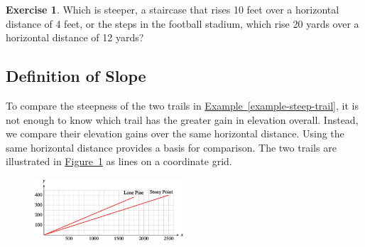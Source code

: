 \documentclass[10pt,]{book}
\theoremstyle{plain}
\theoremstyle{definition}
\newtheorem{exercise}[theorem]{Exercise}
\theoremstyle{definition}
\numberwithin{equation}{section}
\begin{document}
\begin{exercise}\label{exercise-steep-steps}
Which is steeper, a staircase that rises 10 feet over a horizontal distance of 4 feet, or the steps in the football stadium, which rise 20 yards over a horizontal distance of 12 yards?\end{exercise}
\typeout{************************************************}
\typeout{************************************************}
\subsection[Definition of Slope]{Definition of Slope}\label{subsection-19}

    To compare the steepness of the two trails in \hyperref[example-steep-trail]{Example~\ref{example-steep-trail}}, it is not enough to know which trail has the greater gain in elevation overall. Instead, we compare their elevation gains over the same horizontal distance. Using the same horizontal distance provides a basis for comparison. The two trails are illustrated in \hyperref[fig-trail-climb-grid]{Figure~\ref{fig-trail-climb-grid}} as lines on a coordinate grid.
%
\leavevmode%
\begin{figure}
\centering
\includegraphics[width=0.50\textwidth,]{images/fig-trail-climb-grid.svg}\caption{\label{fig-trail-climb-grid}}
\end{figure}
\par
\end{document}
